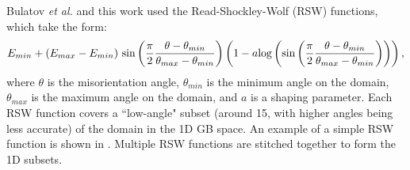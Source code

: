 \documentclass[12pt]{report}
\begin{document}
Bulatov \emph{et al.} and this work used the Read-Shockley-Wolf (RSW) functions,\cite{wolf1989} which take the form:
\begin{equation}
E_{min} + (E_{max} - E_{min})\ \textnormal{sin}\left(\frac{\pi}{2}\frac{\theta-\theta_{min}}{\theta_{max} - \theta_{min}}\right)\left(1-a\textnormal{log}\left(\textnormal{sin}\left(\frac{\pi}{2}\frac{\theta-\theta_{min}}{\theta_{max} - \theta_{min}}\right)\right)\right),
\end{equation}
where $\theta$ is the misorientation angle, $\theta_{min}$ is the minimum angle on the domain, $\theta_{max}$ is the maximum angle on the domain, and $a$ is a shaping parameter.  Each RSW function covers a ``low-angle" subset (around 15\textdegree{}, with higher angles being less accurate)\cite{rohrer2011,wolf1989} of the domain in the 1D GB space.  An example of a simple RSW function is shown in .  Multiple RSW functions are stitched together to form the 1D subsets.
\end{document}
